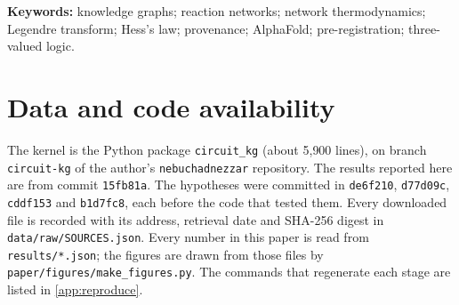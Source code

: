 \documentclass[11pt,a4paper]{article}
\theoremstyle{remark}
\begin{document}
\noindent\textbf{Keywords:} knowledge graphs; reaction networks; network thermodynamics; Legendre transform; Hess's law; provenance; AlphaFold; pre-registration; three-valued logic.

\tableofcontents
\clearpage








\section*{Data and code availability}
The kernel is the Python package \texttt{circuit\_kg} (about 5{,}900 lines), on branch \texttt{circuit-kg} of the author's \texttt{nebuchadnezzar} repository.
The results reported here are from commit \texttt{15fb81a}.
The hypotheses were committed in \texttt{de6f210}, \texttt{d77d09c}, \texttt{cddf153} and \texttt{b1d7fc8}, each before the code that tested them.
Every downloaded file is recorded with its address, retrieval date and SHA-256 digest in \texttt{data/raw/SOURCES.json}.
Every number in this paper is read from \texttt{results/*.json}; the figures are drawn from those files by \texttt{paper/figures/make\_figures.py}.
The commands that regenerate each stage are listed in \cref{app:reproduce}.




\appendix

\end{document}
